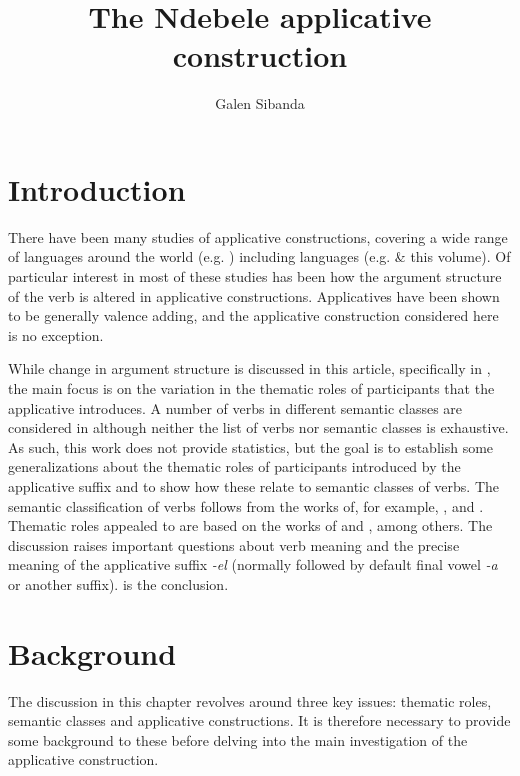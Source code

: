 \documentclass[output=paper]{langsci/langscibook}
\title{The Ndebele applicative construction}
\author{%
 Galen Sibanda \affiliation{Michigan State University} 
}
\begin{document}
\section{Introduction}\label{sec:sibanda:1}

There have been many studies of applicative constructions, covering a wide range of languages around the world (e.g. \citealt{Peterson2007}) including  languages (e.g. \citealt{Ngonyani1996,Mabugu2011,Jerro2016} \& this volume). Of particular interest in most of these studies has been how the argument structure of the verb is altered in applicative constructions. Applicatives have been shown to be generally valence adding, and the  applicative construction considered here is no exception. 

 While change in  argument structure is discussed in this article, specifically in , the main focus is on the variation in the thematic roles of participants that the applicative introduces. A number of verbs in different semantic classes are considered in  although neither the list of verbs nor semantic classes is exhaustive. As such, this work does not provide statistics, but the goal is to establish some generalizations about the thematic roles of participants introduced by the applicative suffix and to show how these relate to semantic classes of verbs. The semantic classification of verbs follows from the works of, for example, \citet{Chafe1970,Dowty1987,Dowty1991,FoleyVanValin1984}, and \citet{Payne1997}. Thematic roles appealed to are based on the works of \citet{Frawley1992,Fillmore1968,Fillmore1977} and \citet{Halliday1970}, among others. The discussion raises important questions about verb meaning and the precise meaning of the applicative suffix \textit{-el} (normally followed by default final vowel \textit{-a} or another suffix).  is the conclusion.

\section{Background}\label{sec:sibanda:2}

The discussion in this chapter revolves around three key issues: thematic roles, semantic classes and applicative constructions. It is therefore necessary to provide some background to these before delving into the main investigation of the  applicative construction. 
\end{document}

